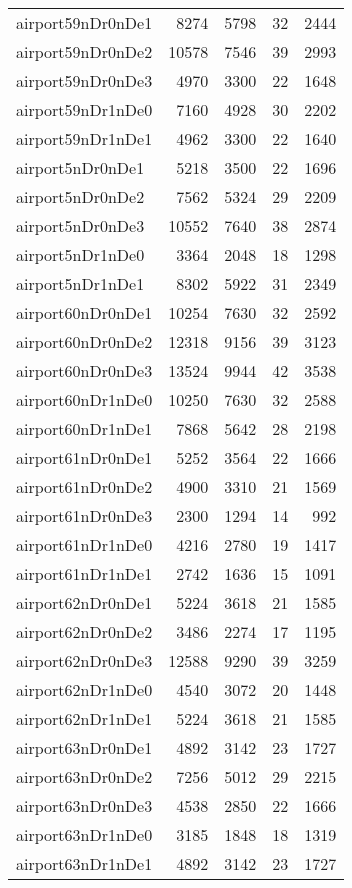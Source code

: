 \begin{longtable}{lrrrr}
airport59nDr0nDe1 & 8274 & 5798 & 32 & 2444 \\
airport59nDr0nDe2 & 10578 & 7546 & 39 & 2993 \\
airport59nDr0nDe3 & 4970 & 3300 & 22 & 1648 \\
airport59nDr1nDe0 & 7160 & 4928 & 30 & 2202 \\
airport59nDr1nDe1 & 4962 & 3300 & 22 & 1640 \\
airport5nDr0nDe1 & 5218 & 3500 & 22 & 1696 \\
airport5nDr0nDe2 & 7562 & 5324 & 29 & 2209 \\
airport5nDr0nDe3 & 10552 & 7640 & 38 & 2874 \\
airport5nDr1nDe0 & 3364 & 2048 & 18 & 1298 \\
airport5nDr1nDe1 & 8302 & 5922 & 31 & 2349 \\
airport60nDr0nDe1 & 10254 & 7630 & 32 & 2592 \\
airport60nDr0nDe2 & 12318 & 9156 & 39 & 3123 \\
airport60nDr0nDe3 & 13524 & 9944 & 42 & 3538 \\
airport60nDr1nDe0 & 10250 & 7630 & 32 & 2588 \\
airport60nDr1nDe1 & 7868 & 5642 & 28 & 2198 \\
airport61nDr0nDe1 & 5252 & 3564 & 22 & 1666 \\
airport61nDr0nDe2 & 4900 & 3310 & 21 & 1569 \\
airport61nDr0nDe3 & 2300 & 1294 & 14 & 992 \\
airport61nDr1nDe0 & 4216 & 2780 & 19 & 1417 \\
airport61nDr1nDe1 & 2742 & 1636 & 15 & 1091 \\
airport62nDr0nDe1 & 5224 & 3618 & 21 & 1585 \\
airport62nDr0nDe2 & 3486 & 2274 & 17 & 1195 \\
airport62nDr0nDe3 & 12588 & 9290 & 39 & 3259 \\
airport62nDr1nDe0 & 4540 & 3072 & 20 & 1448 \\
airport62nDr1nDe1 & 5224 & 3618 & 21 & 1585 \\
airport63nDr0nDe1 & 4892 & 3142 & 23 & 1727 \\
airport63nDr0nDe2 & 7256 & 5012 & 29 & 2215 \\
airport63nDr0nDe3 & 4538 & 2850 & 22 & 1666 \\
airport63nDr1nDe0 & 3185 & 1848 & 18 & 1319 \\
airport63nDr1nDe1 & 4892 & 3142 & 23 & 1727 \\

\end{longtable}
